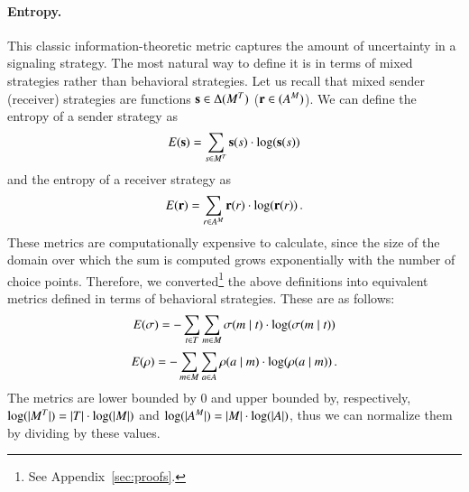 \paragraph{Entropy.}
This classic information-theoretic metric captures the amount of uncertainty in a signaling strategy.
The most natural way to define it is in terms of mixed strategies rather than behavioral strategies.
Let us recall that mixed sender (receiver) strategies are functions $\mathrm{\mathbf{s}} \in \Delta(M^T)$ ($\mathrm{\mathbf{r}} \in (A^M)$).
We can define the entropy of a sender strategy as
\begin{align*}
  E(\mathrm{\mathbf{s}}) = \sum_{s \in M^T} \mathrm{\mathbf{s}}(s) \cdot \log(\mathrm{\mathbf{s}}(s))
\end{align*} 
and the entropy of a receiver strategy as
\begin{align*}
  E(\mathrm{\mathbf{r}}) = \sum_{r \in A^M} \mathrm{\mathbf{r}}(r) \cdot \log(\mathrm{\mathbf{r}}(r)) \,.
\end{align*} 
These metrics are computationally expensive to calculate, since the size of the domain over which the sum is computed grows exponentially with the number of choice points.
Therefore, we converted\footnote{See Appendix~\ref{sec:proofs}.} the above definitions into equivalent metrics defined in terms of behavioral strategies.
These are as follows:
\begin{align*}
  E(\sigma) = -\sum_{t \in T} \sum_{m \in M} \sigma(m \mid t) \cdot \log(\sigma(m \mid t))
\end{align*} 
\begin{align*}
  E(\rho) = -\sum_{m \in M} \sum_{a \in A} \rho(a \mid m) \cdot \log(\rho(a \mid m)) \,.
\end{align*}
The metrics are lower bounded by $0$ and upper bounded by, respectively, $\log(|M^T|) = |T| \cdot \log(|M|)$ and $\log(|A^M|) = |M| \cdot \log(|A|)$, thus we can normalize them by dividing by these values.

